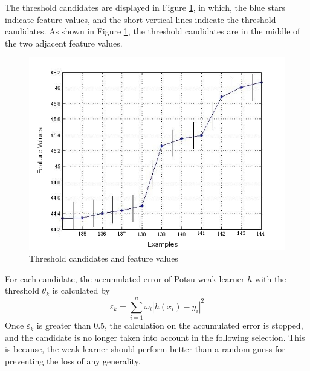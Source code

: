 The threshold candidates are displayed in \mbox{Figure} \ref{fig:candidatespoints}, in which, the blue stars indicate feature values, and the short vertical lines indicate the threshold candidates. As shown in \mbox{Figure} \ref{fig:candidatespoints}, the threshold candidates are in the middle of the two adjacent feature values.
\begin{figure}[t]
 \begin{center}
 \includegraphics[width=\textwidth]{ch5/figures/candidates&points.jpg}
  \caption{Threshold candidates and feature values}
 \label{fig:candidatespoints}
 \end{center}
\end{figure} 
For each candidate, the accumulated error of Potsu weak learner $h$ with the threshold $\theta_{k}$ is calculated by
\begin{equation} 
 \varepsilon_{k} = \sum_{i=1}^{n}\omega_{i}|h(x_{i})-y_{i}|^{2}
\end{equation}
Once $\varepsilon_{k}$ is greater than $0.5$, the calculation on the accumulated error is stopped, and the candidate is no longer taken into account in the following selection. This is because, the weak learner should perform better than a random guess \cite{Freund1995} for preventing the loss of any generality.

